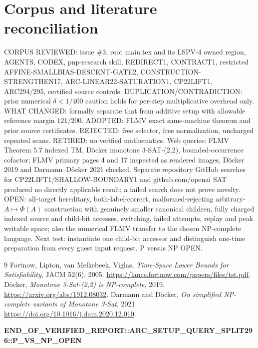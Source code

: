\documentclass[10pt]{article}
\begin{document}
\section{Corpus and literature reconciliation}
CORPUS REVIEWED: issue \#3, root main.tex and its LSPV-4 owned region, AGENTS, CODEX, pnp-research skill, REDIRECT1, CONTRACT1, restricted AFFINE-SMALLBIAS-DESCENT-GATE2, CONSTRUCTION-STRENGTHEN17, ARC-LINEAR22-SATURATION1, CP22LIFT1, ARC294/295, certified source controls. DUPLICATION/CONTRADICTION: prior numerical $\delta<1/400$ caution holds for per-step multiplicative overhead only. WHAT CHANGED: formally separate that from additive setup with allowable reference margin $121/200$. ADOPTED: FLMV exact same-machine theorem and prior source certificates. REJECTED: free selector, free normalization, uncharged repeated scans. RETIRED: no verified mathematics.
Web queries: FLMV Theorem 5.7 indexed TM, D\"ocker monotone 3-SAT-(2,2), bounded-occurrence cofactor; FLMV primary pages 4 and 17 inspected as rendered images, D\"ocker 2019 and Darmann--D\"ocker 2021 checked. Separate repository GitHub searches for CP22LIFT1/SHALLOW-BOUNDARY1 and github.com/openai SAT produced no directly applicable result; a failed search does not prove novelty.
OPEN: all-target hereditary, both-label-correct, malformed-rejecting arbitrary-$A\mapsto\Phi(A)$ construction with genuinely smaller canonical children, fully charged indexed source and child-bit accesses, switching, failed attempts, replay and peak writable space; also the numerical FLMV transfer to the chosen NP-complete language. Next test: instantiate one child-bit accessor and distinguish one-time preparation from every guest input request. P versus NP OPEN.
\begin{thebibliography}{9}
 Fortnow, Lipton, van Melkebeek, Viglas, \emph{Time-Space Lower Bounds for Satisfiability}, JACM 52(6), 2005. \url{https://lance.fortnow.com/papers/files/tst.pdf}.
 D\"ocker, \emph{Monotone 3-Sat-(2,2) is NP-complete}, 2019. \url{https://arxiv.org/abs/1912.08032}.
 Darmann and D\"ocker, \emph{On simplified NP-complete variants of Monotone 3-Sat}, 2021. \url{https://doi.org/10.1016/j.dam.2020.12.010}.
\end{thebibliography}
\noindent\textbf{END\_OF\_VERIFIED\_REPORT::ARC\_SETUP\_QUERY\_SPLIT296::P\_VS\_NP\_OPEN}
\end{document}

